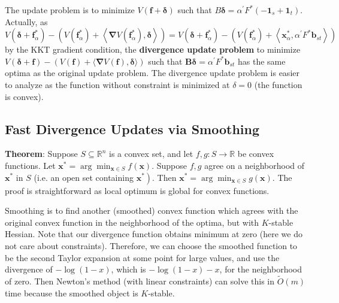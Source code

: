 The update problem is to minimize $V(\boldsymbol{f} + \boldsymbol{\delta})$ such that $B\boldsymbol{\delta} = \alpha^\prime F^* (-\boldsymbol{1}_s + \boldsymbol{1}_t)$. Actually, as $V\left(\boldsymbol{\delta}+\boldsymbol{f}_{\alpha}^{*}\right)-\left(V\left(\boldsymbol{f}_{\alpha}^{*}\right)+\left\langle\boldsymbol{\nabla} V\left(\boldsymbol{f}_{\alpha}^{*}\right), \boldsymbol{\delta}\right\rangle\right)=V\left(\boldsymbol{\delta}+\boldsymbol{f}_{\alpha}^{*}\right)-\left(V\left(\boldsymbol{f}_{\alpha}^{*}\right)+\left\langle\boldsymbol{x}_{\alpha}^{*}, \alpha^{\prime} F^{*} \boldsymbol{b}_{s t}\right\rangle\right)$ by the KKT gradient condition, the \textbf{divergence update problem} to minimize $V(\boldsymbol{\delta}+\boldsymbol{f})-(V(\boldsymbol{f})+\langle\boldsymbol{\nabla} V(\boldsymbol{f}), \boldsymbol{\delta}\rangle)$ such that $\boldsymbol{B} \boldsymbol{\delta}=\alpha^{\prime} F^{*} \boldsymbol{b}_{s t}$ has the same optima as the original update problem. The divergence update problem is easier to analyze as the function without constraint is minimized at $\delta=0$ (the function is convex).

\subsection{Fast Divergence Updates via Smoothing}

\textbf{Theorem}: Suppose $S \subseteq \mathbb{R}^{n}$ is a convex set, and let $f, g: S \rightarrow \mathbb{R}$ be convex functions. Let $\boldsymbol{x}^{*}=\arg \min _{\boldsymbol{x} \in S} f(\boldsymbol{x})$. Suppose $f, g$ agree on a neighborhood of $\boldsymbol{x}^{*}$ in $S$ (i.e. an open set containing $\left.\boldsymbol{x}^{*}\right)$. Then $\boldsymbol{x}^{*}=\arg \min _{\boldsymbol{x} \in S} g(\boldsymbol{x})$. The proof is straightforward as local optimum is global for convex functions.

Smoothing is to find another (smoothed) convex function which agrees with the original convex function in the neighborhood of the optima, but with $K$-stable Hessian. Note that our divergence function obtains minimum at zero (here we do not care about constraints). Therefore, we can choose the smoothed function to be the second Taylor expansion at some point for large values, and use the divergence of $-\log(1-x)$, which is $-\log(1-x)-x$, for the neighborhood of zero. Then Newton's method (with linear constraints) can solve this in $\tilde{O}(m)$ time because the smoothed object is $K$-stable.